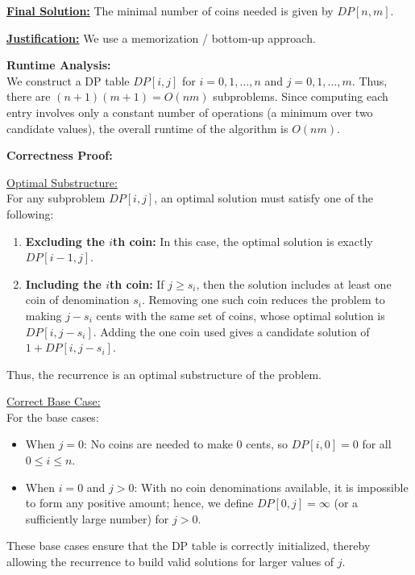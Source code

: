 \documentclass[11pt]{article}
\begin{document}
    \medskip
    
    \underline{\textbf{Final Solution:}} The minimal number of coins needed is given by \(DP[n,m]\).
    
    \medskip
    
    \underline{\textbf{Justification:}} We use a memorization / bottom-up approach. 

    \textbf{Runtime Analysis:} \\
    We construct a DP table \(DP[i,j]\) for \(i=0,1,\dots,n\) and \(j=0,1,\dots,m\). Thus, there are \((n+1)(m+1)=O(nm)\) subproblems. Since computing each entry involves only a constant number of operations (a minimum over two candidate values), the overall runtime of the algorithm is \(O(nm)\).
    
    \bigskip
    
    \textbf{Correctness Proof:}
    
    \underline{Optimal Substructure:} \\
    For any subproblem \(DP[i,j]\), an optimal solution must satisfy one of the following:
    \begin{enumerate}
        \item \textbf{Excluding the \(i\)th coin:} In this case, the optimal solution is exactly \(DP[i-1,j]\).
        \item \textbf{Including the \(i\)th coin:} If \(j \ge s_i\), then the solution includes at least one coin of denomination \(s_i\). Removing one such coin reduces the problem to making \(j-s_i\) cents with the same set of coins, whose optimal solution is \(DP[i,j-s_i]\). Adding the one coin used gives a candidate solution of \(1 + DP[i,j-s_i]\).
    \end{enumerate}
    Thus, the recurrence is an optimal substructure of the problem.
    
    \medskip
    
    \underline{Correct Base Case:} \\
    For the base cases:
    \begin{itemize}
        \item When \(j=0\): No coins are needed to make 0 cents, so \(DP[i,0]=0\) for all \(0\le i\le n\).
        \item When \(i=0\) and \(j>0\): With no coin denominations available, it is impossible to form any positive amount; hence, we define \(DP[0,j]=\infty\) (or a sufficiently large number) for \(j>0\).
    \end{itemize}
    These base cases ensure that the DP table is correctly initialized, thereby allowing the recurrence to build valid solutions for larger values of \(j\).
    
    \newpage

    
    
\end{document}
